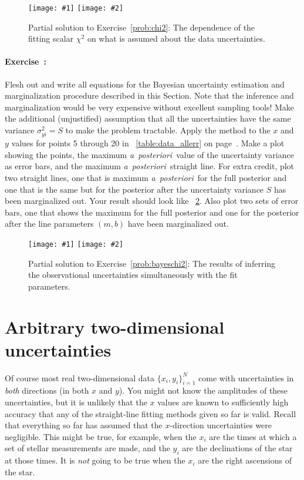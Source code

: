 \documentclass[12pt,twoside]{article}
\newcommand{\exampleplottwo}[2]{%
\begin{center}%
\texttt{[image: \#1]}%
\texttt{[image: \#2]}%
\end{center}%
}
\newcommand{\notenglish}[1]{\textsl{#1}}
\newcommand{\aposteriori}{\notenglish{a~posteriori}}
\newcommand{\sectionname}{Section}
\newcommand{\problemname}{Exercise}
\newcounter{problem}
\newenvironment{problem}{\paragraph{\problemname~\theproblem:}\refstepcounter{problem}}{}
\newcommand{\setofall}[3]{\{{#1}\}_{{#2}}^{{#3}}}
\newcommand{\allxy}{\setofall{x_i,y_i}{i=1}{N}}
\begin{document}
\begin{figure}[htbp]
\exampleplottwo{ex9a}{ex9b}
\caption{Partial solution to \problemname~\ref{prob:chi2}: The
dependence of the fitting scalar $\chi^2$ on what is assumed about the
data uncertainties.}\label{fig:chi2}
\end{figure}

\begin{problem}\label{prob:bayeschi2}
Flesh out and write all equations for the Bayesian uncertainty
estimation and marginalization procedure described in this
\sectionname.  Note that the inference and marginalization would be
very expensive without excellent sampling tools!  Make the additional
(unjustified) assumption that all the uncertainties have the same
variance $\sigma_{yi}^2=S$ to make the problem tractable.  Apply the
method to the $x$ and $y$ values for points 5 through 20 in
\tablename~\ref{table:data_allerr} on
page~\pageref{table:data_allerr}.  Make a plot showing the points, the
maximum \aposteriori\ value of the uncertainty variance as error bars,
and the maximum \aposteriori\ straight line.  For extra credit, plot
two straight lines, one that is maximum \aposteriori\ for the full
posterior and one that is the same but for the posterior after the
uncertainty variance $S$ has been marginalized out.  Your result
should look like \figurename~\ref{fig:bayeschi2}.  Also plot two
sets of error bars, one that shows the maximum for the full posterior
and one for the posterior after the line parameters $(m,b)$ have been
marginalized out.
\end{problem}

\begin{figure}[htbp]
\exampleplottwo{ex10a}{ex10b}
\caption{Partial solution to \problemname~\ref{prob:bayeschi2}: The
results of inferring the observational uncertainties simultaneously
with the fit parameters.}\label{fig:bayeschi2}
\end{figure}

\section{Arbitrary two-dimensional uncertainties}\label{sec:twod}

Of course most real two-dimensional data $\allxy$ come with
uncertainties in \emph{both} directions (in both $x$ and $y$).  You
might not know the amplitudes of these uncertainties, but it is
unlikely that the $x$ values are known to sufficiently high accuracy
that any of the straight-line fitting methods given so far is valid.
Recall that everything so far has assumed that the $x$-direction
uncertainties were negligible.  This might be true, for example, when
the $x_i$ are the times at which a set of stellar measurements are
made, and the $y_i$ are the declinations of the star at those times.
It is \emph{not} going to be true when the $x_i$ are the right
ascensions of the star.
\end{document}
